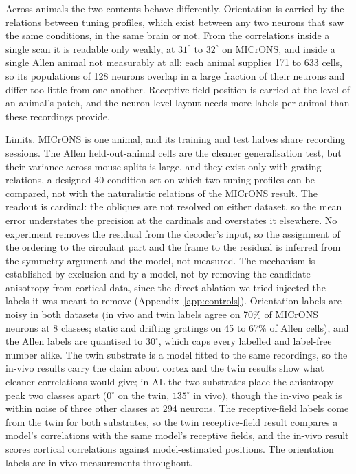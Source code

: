 \documentclass[11pt]{article}
\begin{document}
Across animals the two contents behave differently. Orientation is carried by the relations between tuning profiles, which exist between any two neurons that saw the same conditions, in the same brain or not. From the correlations inside a single scan it is readable only weakly, at $31^\circ$ to $32^\circ$ on MICrONS, and inside a single Allen animal not measurably at all: each animal supplies 171 to 633 cells, so its populations of 128 neurons overlap in a large fraction of their neurons and differ too little from one another. Receptive-field position is carried at the level of an animal's patch, and the neuron-level layout needs more labels per animal than these recordings provide.

Limits. MICrONS is one animal, and its training and test halves share recording sessions. The Allen held-out-animal cells are the cleaner generalisation test, but their variance across mouse splits is large, and they exist only with grating relations, a designed 40-condition set on which two tuning profiles can be compared, not with the naturalistic relations of the MICrONS result. The readout is cardinal: the obliques are not resolved on either dataset, so the mean error understates the precision at the cardinals and overstates it elsewhere. No experiment removes the residual from the decoder's input, so the assignment of the ordering to the circulant part and the frame to the residual is inferred from the symmetry argument and the model, not measured. The mechanism is established by exclusion and by a model, not by removing the candidate anisotropy from cortical data, since the direct ablation we tried injected the labels it was meant to remove (Appendix~\ref{app:controls}). Orientation labels are noisy in both datasets (in vivo and twin labels agree on 70\% of MICrONS neurons at 8 classes; static and drifting gratings on 45 to 67\% of Allen cells), and the Allen labels are quantised to $30^\circ$, which caps every labelled and label-free number alike. The twin substrate is a model fitted to the same recordings, so the in-vivo results carry the claim about cortex and the twin results show what cleaner correlations would give; in AL the two substrates place the anisotropy peak two classes apart ($0^\circ$ on the twin, $135^\circ$ in vivo), though the in-vivo peak is within noise of three other classes at 294 neurons. The receptive-field labels come from the twin for both substrates, so the twin receptive-field result compares a model's correlations with the same model's receptive fields, and the in-vivo result scores cortical correlations against model-estimated positions. The orientation labels are in-vivo measurements throughout.
\end{document}
